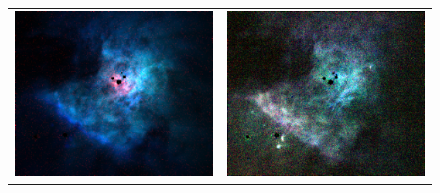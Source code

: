 \documentclass[preprint]{aastex}
\begin{document}
\begin{figure}
  \centering
  \begin{tabular}{@{}l@{}l@{}}
    \includegraphics{rgb-He1-O3-Cl4}
    & \includegraphics{rgb-Si2-permitted} \\

\end{tabular}
\end{figure}
\end{document}
